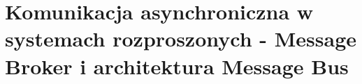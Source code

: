 \section{Komunikacja asynchroniczna w systemach rozproszonych - Message Broker i architektura Message Bus}